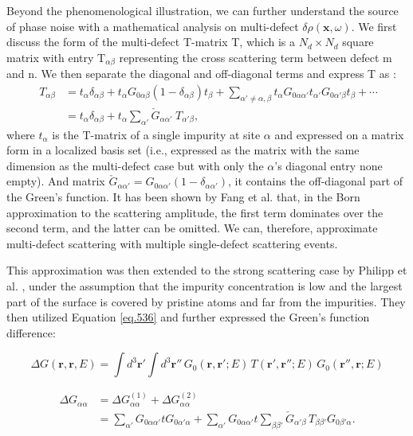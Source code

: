 Beyond the phenomenological illustration, we can further understand the source of phase noise with a mathematical analysis on multi-defect $\delta\rho(\textbf{x},\omega)$. We first discuss the form of the multi-defect T-matrix T, which is a $N_d \times N_d$ square matrix with entry T$_{\alpha \beta}$ representing the cross scattering term between defect m and n. We then separate the diagonal and off-diagonal terms and express T as \cite{leonard1972}:
\begin{align}
	\ T_{\alpha\beta} &= t_{\alpha} \delta_{\alpha\beta} + t_{\alpha} G_{0\alpha\beta} (1 - \delta_{\alpha\beta}) t_{\beta} + \sum_{\alpha' \neq \alpha, \beta} t_{\alpha} G_{0\alpha\alpha'} t_{\alpha'} G_{0\alpha'\beta} t_{\beta} + \cdots \label{eq_tmul}\\
	\label{eq.536}
	&= t_{\alpha} \delta_{\alpha\beta} + t_{\alpha} \sum_{\alpha'} \check{G}_{\alpha\alpha'} \ T_{\alpha'\beta},
\end{align}
\noindent where $t_{\alpha}$ is the T-matrix of a single impurity at site $\alpha$ and expressed on a matrix form in a localized basis set (i.e., expressed as the matrix with the same dimension as the multi-defect case but with only the $\alpha$'s diagonal entry none empty). And matrix $\check{G}_{\alpha\alpha'} = G_{0\alpha\alpha'}(1-\delta_{\alpha\alpha'})$, it contains the off-diagonal part of the Green's function. It has been shown by Fang et al. \cite{fangTheoryQuasiparticleInterference2013} that, in the Born approximation to the scattering amplitude, the first term dominates over the second term, and the latter can be omitted. We can, therefore, approximate multi-defect scattering with multiple single-defect scattering events. 

This approximation was then extended to the strong scattering case by Philipp et al. \cite{russmannInitioTheoryFourierTransformed2021}, under the assumption that the impurity concentration is low and the largest part of the surface is covered by pristine atoms and far from the impurities. They then utilized Equation \ref{eq.536} and further expressed the Green's function difference:

\[
\Delta G(\mathbf{r}, \mathbf{r}, E) = \int d^3 \mathbf{r}' \int d^3 \mathbf{r}'' \, G_0(\mathbf{r}, \mathbf{r}'; E) \, T(\mathbf{r}', \mathbf{r}''; E) \, G_0(\mathbf{r}'', \mathbf{r}; E)
\]

\begin{align}
	\label{eq.537}
	\Delta G_{\alpha \alpha} &= \Delta G^{(1)}_{\alpha \alpha} + \Delta G^{(2)}_{\alpha \alpha} \\
	\label{eq.538}
	&= \sum_{\alpha'} G_{0\alpha \alpha'} t G_{0\alpha' \alpha} + \sum_{\alpha'} G_{0\alpha \alpha'} t\sum_{\beta \beta'} \check{G}_{\alpha' \beta} \, T_{\beta \beta'} G_{0\beta' \alpha}.
\end{align}

